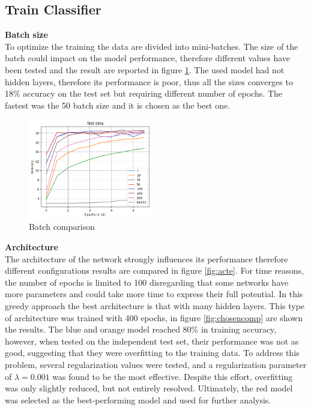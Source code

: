 \documentclass{article}
\begin{document}
\begin{multicols}{2}
\subsection{Train Classifier}

\textbf{Batch size}\\
To optimize the training the data are divided into mini-batches. The size of the batch could impact on the model performance, therefore different
values have been tested and the result are reported in figure \ref{fig:bcte}. The used model had not hidden layers, therefore its performance is poor, thus
all the sizes converges to 18\% accuracy on the test set but requiring different number of epochs. The fastest was the 50 batch size and it is chosen as the best one.

    \begin{figure}[H]
        \centering
        \includegraphics[width=0.48\textwidth]{batch_comp_test.png}
        \caption{\small Batch comparison}
        \label{fig:bcte}
    \end{figure}

\noindent
\textbf{Architecture}\\
The architecture of the network strongly influences its performance therefore different configurations results are compared in figure \ref{fig:acte}.
For time reasons, the number of epochs is limited to 100 disregarding that some networks have more parameters and could take more time to express
their full potential.
In this greedy approach the best architecture is that with many hidden layers. This type of architecture was trained with 400 epochs, in figure 
\ref{fig:chosencomp} are shown the results. The blue and orange model reached 80\% in training
accuracy, however, when tested on the independent test set, their performance was not as good, suggesting that they were overfitting to the training data.
To address this problem, several regularization values were tested, and a regularization parameter of $\lambda = 0.001$ was found to be the most effective. 
Despite this effort, overfitting was only slightly reduced, but not entirely resolved. Ultimately, the red model was selected as the best-performing model 
and used for further analysis.


\end{multicols}
\end{document}
